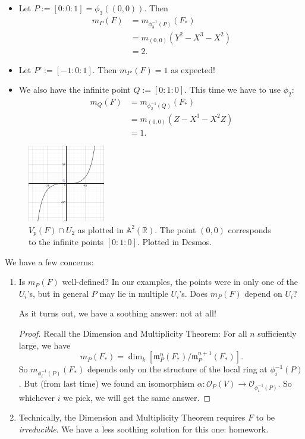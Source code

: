 \documentclass[12pt]{article}
\newcommand{\real}{\mathbb{R}}
\newcommand{\ita}[1]{\textit{#1}}
\theoremstyle{definition}
\begin{document}
\begin{itemize}
    \item Let $P:=[0:0:1]=\phi_3((0,0))$. Then
    \begin{align*}
        m_P(F)&=m_{\phi_3^{-1}(P)}(F_*)\\
        &=m_{(0,0)}(Y^2-X^3-X^2)\\
        &=\boxed{2.}
    \end{align*}
    \item Let $P':=[-1:0:1]$. Then $m_{P'}(F)=1$ as expected!
    \item We also have the infinite point $Q:=[0:1:0]$. This time we have to use $\phi_2$:
    \begin{align*}
        m_Q(F)&=m_{\phi_2^{-1}(Q)}(F_*)\\
        &=m_{(0,0)}(Z-X^3-X^2Z)\\
        &=1.
    \end{align*}
\end{itemize}
\begin{figure}[H]
    \centering
    \includegraphics[width=0.3\textwidth]{33.png}
    \caption{$V_p(F)\cap U_2$ as plotted in $\mathbb{A}^2(\real)$. The point $(0,0)$ corresponds to the infinite points $[0:1:0]$. Plotted in Desmos.}
\end{figure}
We have a few concerns:
\begin{enumerate}
    \item Is $m_P(F)$ well-defined? In our examples, the points were in only one of the $U_i$'s, but in general $P$ may lie in multiple $U_i$'s. Does $m_P(F)$ depend on $U_i$?
    
    As it turns out, we have a soothing answer: not at all!
    \begin{proof}
        Recall the Dimension and Multiplicity Theorem: For all $n$ sufficiently large, we have
        \[m_P(F_*)=\dim_k\left[\mathfrak{m}_P^n(F_*)/\mathfrak{m}_P^{n+1}(F_*)\right].\]
        So $m_{\phi_i^{-1}(P)}(F_*)$ depends only on the structure of the local ring at $\phi_i^{-1}(P)$. But (from last time) we found an isomorphism $\alpha:\mathcal{O}_P(V)\to\mathcal{O}_{\phi_i^{-1}(P)}$. So whichever $i$ we pick, we will get the same answer.
    \end{proof}
    \item Technically, the Dimension and Multiplicity Theorem requires $F$ to be \ita{irreducible}. We have a less soothing solution for this one: homework.
\end{enumerate}
\end{document}
